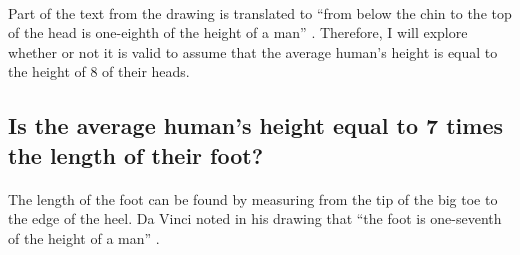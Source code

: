 \documentclass[]{article}
\begin{document}
\paragraph{}

Part of the text from the drawing is translated to ``from below the chin
to the top of the head is one-eighth of the height of a man''
\citep{Wikipedia:Vitruvian}. Therefore, I will explore whether or not it
is valid to assume that the average human's height is equal to the
height of 8 of their heads.

\subsection{Is the average human's height equal to 7 times the length of their foot?}
\label{sec:rq4}
\paragraph{}

The length of the foot can be found by measuring from the tip of the big
toe to the edge of the heel. Da Vinci noted in his drawing that ``the
foot is one-seventh of the height of a man''
\citep{Wikipedia:Vitruvian}.
\end{document}
